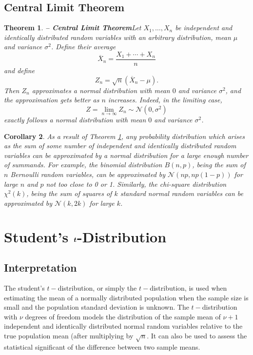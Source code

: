 \documentclass[1pt]{report}
\newtheorem{thm}{Theorem}[chapter]
\newtheorem{cor}[thm]{Corollary}
\newcommand{\<}{\langle}
\renewcommand{\>}{\rangle}
\renewcommand{\bar}{\overline}
\newcommand{\NN}{\mathcal{N}}
\begin{document}
\subsection{Central Limit Theorem}
\begin{thm}\textbf{ -- Central Limit Theorem}\label{thm:centrallimit}
Let $X_1, \dots, X_n$ be independent and identically distributed random variables with an arbitrary distribution, mean $\mu$ and variance $\sigma^2$. Define their average
$$\bar X_n = \frac{X_1 + \cdots + X_n}{n}$$
and define
$$Z_n = \sqrt{n}\left(\bar X_n - \mu\right).$$
Then $Z_n$ approximates a normal distribution with mean $0$ and variance $\sigma^2$, and the approximation gets better as $n$ increases. Indeed, in the limiting case,
$$Z = \lim\limits_{n\to\infty} Z_n \sim \NN(0, \sigma^2)$$
exactly follows a normal distribution with mean $0$ and variance $\sigma^2$.
\end{thm}
\begin{cor}
As a result of Theorem \ref{thm:centrallimit}, any probability distribution which arises as the sum of some number of independent and identically distributed random variables can be approximated by a normal distribution for a large enough number of summands. For example, the binomial distribution $B(n,p)$, being the sum of $n$ Bernoulli random variables, can be approximated by $\NN\left(np, np(1-p)\right)$ for large $n$ and $p$ not too close to 0 or 1. Similarly, the chi-square distribution $\chi^2(k)$, being the sum of squares of $k$ standard normal random variables can be approximated by $\NN(k, 2k)$ for large $k$.
\end{cor}
\newpage
\newpage
\section[Student's $\MakeLowercase{t}-$Distribution]{Student's $\boldsymbol{\MakeLowercase{t}}$-Distribution}
\subsection{Interpretation}
The student's $t-$distribution, or simply the $t-$distribution, is used when estimating the mean of a normally distributed population when the sample size is small and the population standard deviation is unknown. The $t-$distribution with $\nu$ degrees of freedom models the distribution of the sample mean of $\nu+1$ independent and identically distributed normal random variables relative to the true population mean (after multiplying by $\sqrt{n}$. It can also be used to assess the statistical significant of the difference between two sample means. 
\end{document}
